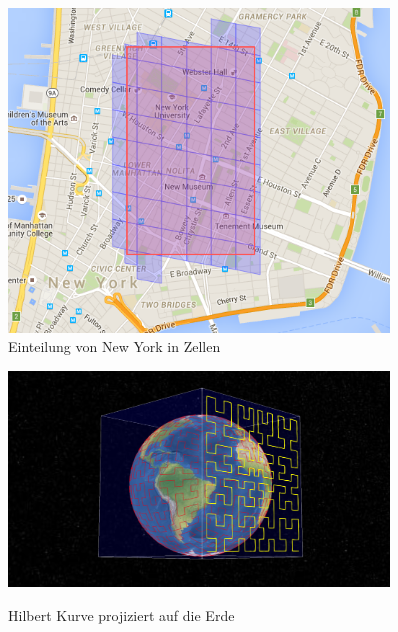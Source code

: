 \documentclass[course=erap]{aspdoc}
\begin{document}
\begin{figure}
    \centering
    \begin{minipage}{0.45\textwidth}
        \centering
        \includegraphics[width=0.9\textwidth]{Map}\\
        \caption{Einteilung von New York in Zellen}
        \label{fig:Gmaps}
    \end{minipage}\hfill
    \begin{minipage}{0.45\textwidth}
        \centering
        \includegraphics[width=0.9\textwidth]{Earth} \\
        \caption{Hilbert Kurve projiziert auf die Erde}
        \label{fig:hilbertCurveOnEarth}
    \end{minipage}
\end{figure}

\end{document}
